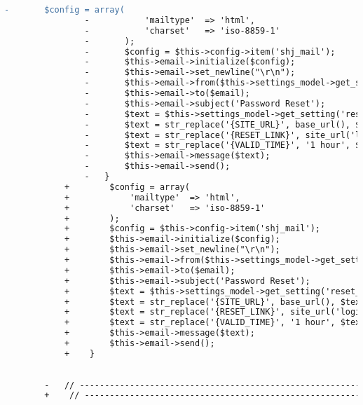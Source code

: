 \begin{lstlisting}[language=diff, caption=Perubahan pada kode User\_model.php]
				-		$config = array(
				-			'mailtype'  => 'html',
				-			'charset'   => 'iso-8859-1'
				-		);
				-		$config = $this->config->item('shj_mail');
				-		$this->email->initialize($config);
				-		$this->email->set_newline("\r\n");
				-		$this->email->from($this->settings_model->get_setting('mail_from'), $this->settings_model->get_setting('mail_from_name'));
				-		$this->email->to($email);
				-		$this->email->subject('Password Reset');
				-		$text = $this->settings_model->get_setting('reset_password_mail');
				-		$text = str_replace('{SITE_URL}', base_url(), $text);
				-		$text = str_replace('{RESET_LINK}', site_url('login/reset/'.$passchange_key), $text);
				-		$text = str_replace('{VALID_TIME}', '1 hour', $text); // links are valid for 1 hour
				-		$this->email->message($text);
				-		$this->email->send();
				-	}
			+        $config = array(
			+            'mailtype'  => 'html',
			+            'charset'   => 'iso-8859-1'
			+        );
			+        $config = $this->config->item('shj_mail');
			+        $this->email->initialize($config);
			+        $this->email->set_newline("\r\n");
			+        $this->email->from($this->settings_model->get_setting('mail_from'), $this->settings_model->get_setting('mail_from_name'));
			+        $this->email->to($email);
			+        $this->email->subject('Password Reset');
			+        $text = $this->settings_model->get_setting('reset_password_mail');
			+        $text = str_replace('{SITE_URL}', base_url(), $text);
			+        $text = str_replace('{RESET_LINK}', site_url('login/reset/'.$passchange_key), $text);
			+        $text = str_replace('{VALID_TIME}', '1 hour', $text); // links are valid for 1 hour
			+        $this->email->message($text);
			+        $this->email->send();
			+    }
		
		
		-	// ------------------------------------------------------------------------
		+    // ------------------------------------------------------------------------
		

\end{lstlisting}
